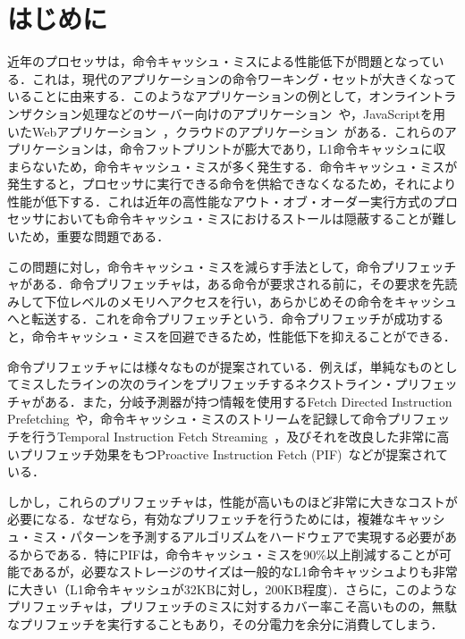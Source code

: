 
\chapter{はじめに}
\label{sec:introduction}
近年のプロセッサは，命令キャッシュ・ミスによる性能低下が問題となっている．これは，現代のアプリケーションの命令ワーキング・セットが大きくなっていることに由来する．このようなアプリケーションの例として，オンライントランザクション処理などのサーバー向けのアプリケーション~\cite{Ranganathan1998,Vaidya2008,Ferdman2012}や，JavaScriptを用いたWebアプリケーション~\cite{Zhu2015,Chadha2014}，クラウドのアプリケーション~\cite{Ferdman2012,Ayers2019}がある．これらのアプリケーションは，命令フットプリントが膨大であり，L1命令キャッシュに収まらないため，命令キャッシュ・ミスが多く発生する．命令キャッシュ・ミスが発生すると，プロセッサに実行できる命令を供給できなくなるため，それにより性能が低下する．これは近年の高性能なアウト・オブ・オーダー実行方式のプロセッサにおいても命令キャッシュ・ミスにおけるストールは隠蔽することが難しいため，重要な問題である．

この問題に対し，命令キャッシュ・ミスを減らす手法として，命令プリフェッチャがある．命令プリフェッチャは，ある命令が要求される前に，その要求を先読みして下位レベルのメモリへアクセスを行い，あらかじめその命令をキャッシュへと転送する．これを命令プリフェッチという．命令プリフェッチが成功すると，命令キャッシュ・ミスを回避できるため，性能低下を抑えることができる．

命令プリフェッチャには様々なものが提案されている．例えば，単純なものとしてミスしたラインの次のラインをプリフェッチするネクストライン・プリフェッチャがある．また，分岐予測器が持つ情報を使用するFetch Directed Instruction Prefetching~\cite{Reinman1999}や，命令キャッシュ・ミスのストリームを記録して命令プリフェッチを行うTemporal Instruction Fetch Streaming~\cite{Ferdman2008}，及びそれを改良した非常に高いプリフェッチ効果をもつProactive Instruction Fetch (PIF)~\cite{Ferdman2011}などが提案されている．

しかし，これらのプリフェッチャは，性能が高いものほど非常に大きなコストが必要になる．なぜなら，有効なプリフェッチを行うためには，複雑なキャッシュ・ミス・パターンを予測するアルゴリズムをハードウェアで実現する必要があるからである．特にPIFは，命令キャッシュ・ミスを90\%以上削減することが可能であるが，必要なストレージのサイズは一般的なL1命令キャッシュよりも非常に大きい（L1命令キャッシュが32KBに対し，200KB程度)．さらに，このようなプリフェッチャは，プリフェッチのミスに対するカバー率こそ高いものの，無駄なプリフェッチを実行することもあり，その分電力を余分に消費してしまう．

